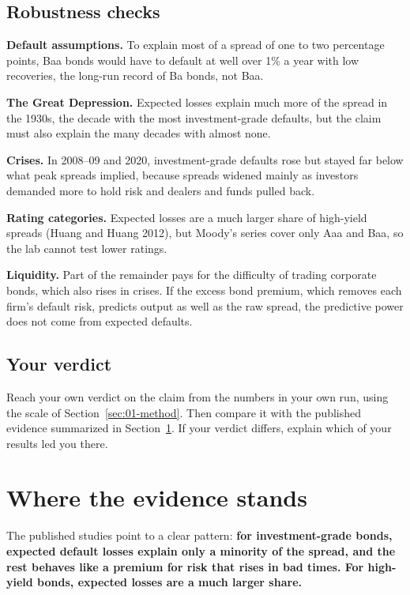 \subsection{Robustness checks}
\label{sec:15-stress}

\textbf{Default assumptions.} To explain most of a spread of one to two percentage points, Baa bonds would have to default at well over 1\% a year with low recoveries, the long-run record of Ba bonds, not Baa.

\textbf{The Great Depression.} Expected losses explain much more of the spread in the 1930s, the decade with the most investment-grade defaults, but the claim must also explain the many decades with almost none.

\textbf{Crises.} In 2008--09 and 2020, investment-grade defaults rose but stayed far below what peak spreads implied, because spreads widened mainly as investors demanded more to hold risk and dealers and funds pulled back.

\textbf{Rating categories.} Expected losses are a much larger share of high-yield spreads (Huang and Huang 2012), but Moody's series cover only Aaa and Baa, so the lab cannot test lower ratings.

\textbf{Liquidity.} Part of the remainder pays for the difficulty of trading corporate bonds, which also rises in crises. If the excess bond premium, which removes each firm's default risk, predicts output as well as the raw spread, the predictive power does not come from expected defaults.

\subsection*{Your verdict}

Reach your own verdict on the claim from the numbers in your own run, using the scale of Section~\ref{sec:01-method}. Then compare it with the published evidence summarized in Section~\ref{sec:15-verdict}. If your verdict differs, explain which of your results led you there.

\section{Where the evidence stands}
\label{sec:15-verdict}

The published studies point to a clear pattern: \textbf{for investment-grade bonds, expected default losses explain only a minority of the spread, and the rest behaves like a premium for risk that rises in bad times. For high-yield bonds, expected losses are a much larger share.}

